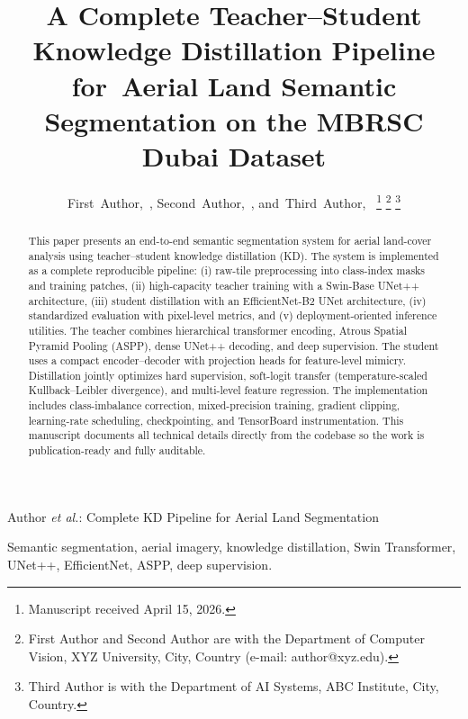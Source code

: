 \documentclass[journal]{IEEEtran}
\begin{document}
\title{A Complete Teacher--Student Knowledge Distillation Pipeline for\
Aerial Land Semantic Segmentation on the MBRSC Dubai Dataset}

\author{First~Author,~,
        Second~Author,~\IEEEmembership{Member,~IEEE},
        and~Third~Author,~%
\thanks{Manuscript received April 15, 2026.}%
\thanks{First Author and Second Author are with the Department of Computer Vision, XYZ University, City, Country (e-mail: author@xyz.edu).}%
\thanks{Third Author is with the Department of AI Systems, ABC Institute, City, Country.}%
}

%
{Author \MakeLowercase{\textit{et al.}}: Complete KD Pipeline for Aerial Land Segmentation}

\maketitle

\begin{abstract}
This paper presents an end-to-end semantic segmentation system for aerial land-cover analysis using teacher--student knowledge distillation (KD). The system is implemented as a complete reproducible pipeline: (i) raw-tile preprocessing into class-index masks and training patches, (ii) high-capacity teacher training with a Swin-Base UNet++ architecture, (iii) student distillation with an EfficientNet-B2 UNet architecture, (iv) standardized evaluation with pixel-level metrics, and (v) deployment-oriented inference utilities. The teacher combines hierarchical transformer encoding, Atrous Spatial Pyramid Pooling (ASPP), dense UNet++ decoding, and deep supervision. The student uses a compact encoder--decoder with projection heads for feature-level mimicry. Distillation jointly optimizes hard supervision, soft-logit transfer (temperature-scaled Kullback--Leibler divergence), and multi-level feature regression. The implementation includes class-imbalance correction, mixed-precision training, gradient clipping, learning-rate scheduling, checkpointing, and TensorBoard instrumentation. This manuscript documents all technical details directly from the codebase so the work is publication-ready and fully auditable.
\end{abstract}

\begin{IEEEkeywords}
Semantic segmentation, aerial imagery, knowledge distillation, Swin Transformer, UNet++, EfficientNet, ASPP, deep supervision.
\end{IEEEkeywords}
\end{document}
